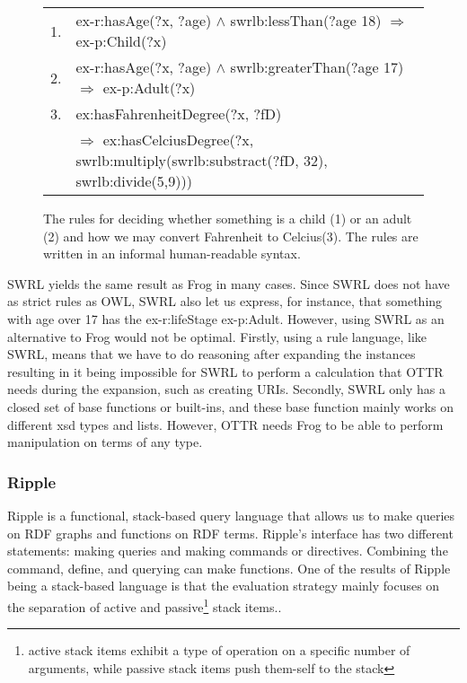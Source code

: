 \begin{figure}
    \begin{tabular}[ht!]{c l}
        1. & ex-r:hasAge(?x, ?age) $\wedge$ swrlb:lessThan(?age 18) $\Rightarrow$ ex-p:Child(?x) \\
        2. & ex-r:hasAge(?x, ?age) $\wedge$ swrlb:greaterThan(?age 17) $\Rightarrow$ ex-p:Adult(?x) \\
        3. & ex:hasFahrenheitDegree(?x, ?fD) \\
        & $\Rightarrow$ ex:hasCelciusDegree(?x, swrlb:multiply(swrlb:substract(?fD, 32), swrlb:divide(5,9)))\\
    \end{tabular}
    \caption{The rules for deciding whether something is a child (1) or an adult (2) and how we may convert Fahrenheit to Celcius(3). The rules are written in an informal human-readable syntax\autocite{SWRL}.}
    \label{fig:SWRL-example}
\end{figure}

\para
SWRL yields the same result as Frog in many cases. Since SWRL does not have as strict rules as OWL, SWRL also let us express, for instance, that something with age over 17 has the ex-r:lifeStage ex-p:Adult. However, using SWRL as an alternative to Frog would not be optimal. Firstly, using a rule language, like SWRL, means that we have to do reasoning after expanding the instances resulting in it being impossible for SWRL to perform a calculation that OTTR needs during the expansion, such as creating URIs. Secondly, SWRL only has a closed set of base functions or built-ins, and these base function mainly works on different xsd types and lists. However, OTTR needs Frog to be able to perform manipulation on terms of any type.

\subsubsection{Ripple}
Ripple is a functional, stack-based query language that allows us to make queries on RDF graphs and functions on RDF terms. Ripple's interface has two different statements: making queries and making commands or directives. Combining the command, define, and querying can make functions. One of the results of Ripple being a stack-based language is that the evaluation strategy mainly focuses on the separation of active and passive\footnote{active stack items exhibit a type of operation on a specific number of arguments, while passive stack items push them-self to the stack} stack items.\autocite{ShinavierJoshua_FPLD}.

